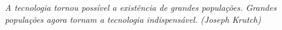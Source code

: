 
\renewcommand{\epigraphname}{EPÍGRAFE}

\begin{epigrafe}

\textit{A tecnologia tornou possível a existência de grandes populações. Grandes populações agora tornam a tecnologia indispensável. (Joseph Krutch)}

\end{epigrafe}
\pagebreak


